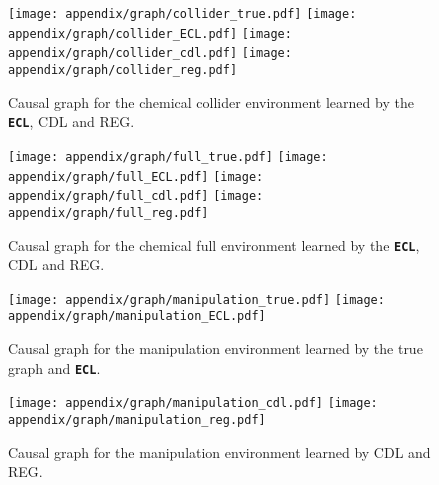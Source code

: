 \begin{figure}[h]
    \centering
    \texttt{[image: appendix/graph/collider\_true.pdf]}
    \texttt{[image: appendix/graph/collider\_ECL.pdf]}
    \texttt{[image: appendix/graph/collider\_cdl.pdf]}
    \texttt{[image: appendix/graph/collider\_reg.pdf]}
    
    \caption{Causal graph for the chemical collider environment learned by the \texttt{\textbf{ECL}}, CDL and REG.}
    \label{fig:abl_collider_graph}
\end{figure}

\begin{figure}[h]
    \centering
    \texttt{[image: appendix/graph/full\_true.pdf]}
    \texttt{[image: appendix/graph/full\_ECL.pdf]}
    \texttt{[image: appendix/graph/full\_cdl.pdf]}
    \texttt{[image: appendix/graph/full\_reg.pdf]}
    
    \caption{Causal graph for the chemical full environment learned by the \texttt{\textbf{ECL}}, CDL and REG.}
    \label{fig:abl_full_graph}
\end{figure}

\begin{figure}[h]
    \centering
    \texttt{[image: appendix/graph/manipulation\_true.pdf]}
    \texttt{[image: appendix/graph/manipulation\_ECL.pdf]}
    
    \caption{Causal graph for the manipulation environment learned by the true graph and \texttt{\textbf{ECL}}.}
    \label{fig:abl_manipulation_graph_1}
\end{figure}

\begin{figure}[h]
    \centering
    \texttt{[image: appendix/graph/manipulation\_cdl.pdf]}
    \texttt{[image: appendix/graph/manipulation\_reg.pdf]}
    
    \caption{Causal graph for the manipulation environment learned by CDL and REG.}
    \label{fig:abl_manipulation_graph_2}
\end{figure}



